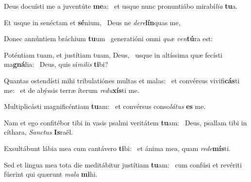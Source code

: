 \item Deus docuísti me a juventúte \textbf{me}a:~\psstar{} et usque nunc pronuntiábo mirabí\textit{lia} \textbf{tu}a.
\item Et usque in senéctam et \textbf{sé}nium,~\psstar{} Deus ne \textit{dere}\textbf{lín}quas me,
\item Donec annúntiem bráchium \textbf{tu}um~\psstar{} generatióni omni \textit{quæ} \textit{ven}\textbf{tú}ra est:
\item Poténtiam tuam, et justítiam tuam, Deus,~\pscross{} usque in altíssima quæ fecísti ma\textbf{gná}lia:~\psstar{} Deus, quis sí\textit{milis} \textbf{ti}bi?
\item Quantas ostendísti mihi tribulatiónes multas et malas:~\pscross{} et convérsus vivifi\textbf{cás}ti me:~\psstar{} et de abýssis terræ íterum \textit{redu}\textbf{xís}ti me.
\item Multiplicásti magnificéntiam \textbf{tu}am:~\psstar{} et convérsus conso\textit{látus} \textbf{es} me.
\item Nam et ego confitébor tibi in vasis psalmi veritátem \textbf{tu}am:~\psstar{} Deus, psallam tibi in cíthara, \textit{Sanctus} \textbf{Is}raël.
\item Exsultábunt lábia mea cum cantávero \textbf{ti}bi:~\psstar{} et ánima mea, quam \textit{rede}\textbf{mís}ti.
\item Sed et lingua mea tota die meditábitur justítiam \textbf{tu}am:~\psstar{} cum confúsi et revériti fúerint qui quærunt \textit{mala} \textbf{mi}hi.
